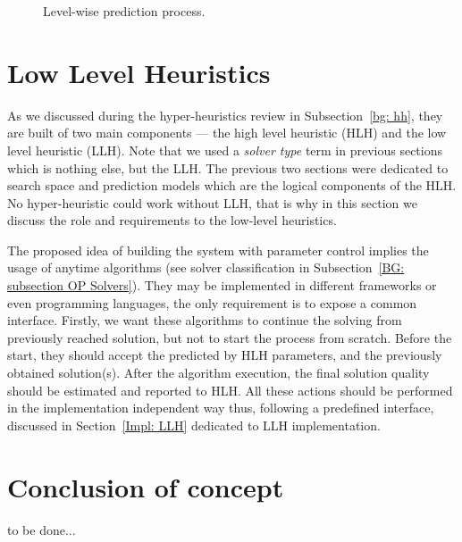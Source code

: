\begin{figure}
	\centering
	
	\caption{Level-wise prediction process.}
	\label{concept:pict:Level-wise prediction process}
\end{figure}


\section{Low Level Heuristics}\label{concept: llh}
As we discussed during the hyper-heuristics review in Subsection~\ref{bg: hh}, they are built of two main components — the high level heuristic (HLH) and the low level heuristic (LLH). Note that we used a \emph{solver type} term in previous sections which is nothing else, but the LLH. The previous two sections were dedicated to search space and prediction models which are the logical components of the HLH. No hyper-heuristic could work without LLH, that is why in this section we discuss the role and requirements to the low-level heuristics.

The proposed idea of building the system with parameter control implies the usage of anytime algorithms (see solver classification in Subsection~\ref{BG: subsection OP Solvers}).
They may be implemented in different frameworks or even programming languages, the only requirement is to expose a common interface. Firstly, we want these algorithms to continue the solving from previously reached solution, but not to start the process from scratch. Before the start, they should accept the predicted by HLH parameters, and the previously obtained solution(s). After the algorithm execution, the final solution quality should be estimated and reported to HLH. All these actions should be performed in the implementation independent way thus, following a predefined interface, discussed in Section~\ref{Impl: LLH} dedicated to LLH implementation.


\section{Conclusion of concept}
to be done...